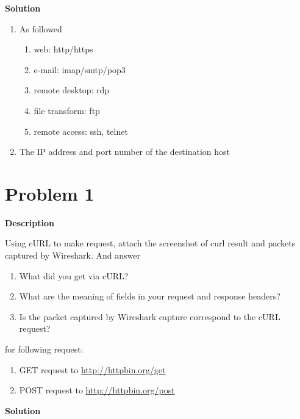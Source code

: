 \documentclass[12pt,letterpaper]{ctexart}
\begin{document}
{\bf Solution}

\begin{enumerate}
  \item As followed
  \begin{enumerate}
    \item  web: http/https
    \item e-mail: imap/smtp/pop3
    \item remote desktop: rdp
    \item file transform: ftp
    \item remote access: ssh, telnet
  \end{enumerate}
  \item The IP address and port number of the destination host
\end{enumerate}

\newpage

\section*{Problem 1}

{\bf Description}

Using cURL to make request, attach the screenshot of curl result and packets captured by Wireshark. And answer

\begin{enumerate}
  \item What did you get via cURL?
  \item What are the meaning of fields in your request and response headers?
  \item Is the packet captured by Wireshark capture correspond to the cURL request?
\end{enumerate}

for following request:
\begin{enumerate}
  \item GET request to \url{http://httpbin.org/get}
  \item POST request to \url{http://httpbin.org/post}
\end{enumerate}

{\bf Solution}
\end{document}
